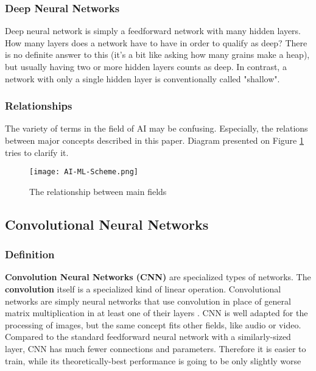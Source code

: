 \documentclass[../Main.tex]{subfiles}
\begin{document}
    \subsubsection{Deep Neural Networks}
    Deep neural network is simply a feedforward network with many hidden layers. 
    How many layers does a network have to have in order to qualify as deep? There is no definite answer to this (it's a bit like asking how many grains make a heap), but usually having two or more hidden layers counts as deep. In contrast, a network with only a single hidden layer is conventionally called "shallow". 
    
\newpage

    \subsubsection{Relationships}
    The variety of terms in the field of AI may be confusing. Especially, the relations between major concepts described in this paper. Diagram presented on Figure \ref{fig:AI-ML-Scheme} tries to clarify it.
    \\
    \begin{figure}[h!]
        \centering
        \texttt{[image: AI-ML-Scheme.png]}
        \caption{The relationship between main fields}
        \label{fig:AI-ML-Scheme}
    \end{figure}

\subsection{Convolutional Neural Networks}

    \subsubsection{Definition}
    \textbf{Convolution Neural Networks (CNN)} are specialized types of networks. The \textbf{convolution} itself is a specialized kind of linear operation. Convolutional networks are simply neural networks that use convolution in place of general matrix multiplication in at least one of their layers \cite{Goodfellow-et-al-2016}.  CNN is well adapted for the processing of images, but the same concept fits other fields, like audio or video. 
    Compared to the standard feedforward neural network with a similarly-sized layer, CNN has much fewer connections and parameters. Therefore it is easier to train, while its theoretically-best performance is going to be only slightly worse 
        
\end{document}
